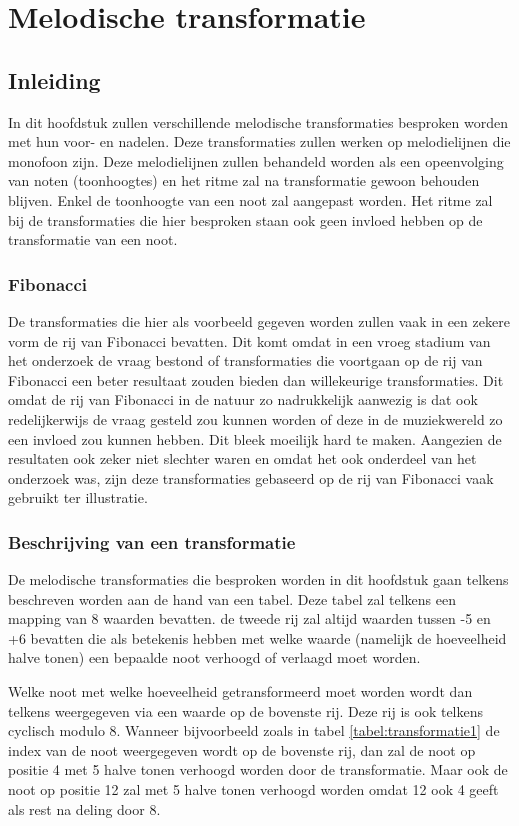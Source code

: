 \chapter{Melodische transformatie}
\label{hoofdstuk:MT}

\section{Inleiding}
In dit hoofdstuk zullen verschillende melodische transformaties besproken worden met hun voor- en nadelen. Deze transformaties zullen werken op melodielijnen die monofoon zijn. Deze melodielijnen zullen behandeld worden als een opeenvolging van noten (toonhoogtes) en het ritme zal na transformatie gewoon behouden blijven. Enkel de toonhoogte van een noot zal aangepast worden. Het ritme zal bij de transformaties die hier besproken staan ook geen invloed hebben op de transformatie van een noot. 

\subsection{Fibonacci}
De transformaties die hier als voorbeeld gegeven worden zullen vaak in een zekere vorm de rij van Fibonacci\cite{url:Fibonacci} bevatten. Dit komt omdat in een vroeg stadium van het onderzoek de vraag bestond of transformaties die voortgaan op de rij van Fibonacci een beter resultaat zouden bieden dan willekeurige transformaties. Dit omdat de rij van Fibonacci in de natuur zo nadrukkelijk aanwezig is dat ook redelijkerwijs de vraag gesteld zou kunnen worden of deze in de muziekwereld zo een invloed zou kunnen hebben. Dit bleek moeilijk hard te maken. Aangezien de resultaten ook zeker niet slechter waren en omdat het ook onderdeel van het onderzoek was, zijn deze transformaties gebaseerd op de rij van Fibonacci vaak gebruikt ter illustratie.

\subsection{Beschrijving van een transformatie}
De melodische transformaties die besproken worden in dit hoofdstuk gaan telkens beschreven worden aan de hand van een tabel. Deze tabel zal telkens een mapping van 8 waarden bevatten. de tweede rij zal altijd waarden tussen -5 en +6 bevatten die als betekenis hebben met welke waarde (namelijk de hoeveelheid halve tonen) een bepaalde noot verhoogd of verlaagd moet worden. 

Welke noot met welke hoeveelheid getransformeerd moet worden wordt dan telkens weergegeven via een waarde op de bovenste rij. Deze rij is ook telkens cyclisch modulo 8. Wanneer bijvoorbeeld zoals in tabel \ref{tabel:transformatie1} de index van de noot weergegeven wordt op de bovenste rij, dan zal de noot op positie 4 met 5 halve tonen verhoogd worden door de transformatie. Maar ook de noot op positie 12 zal met 5 halve tonen verhoogd worden omdat 12 ook 4 geeft als rest na deling door 8.

